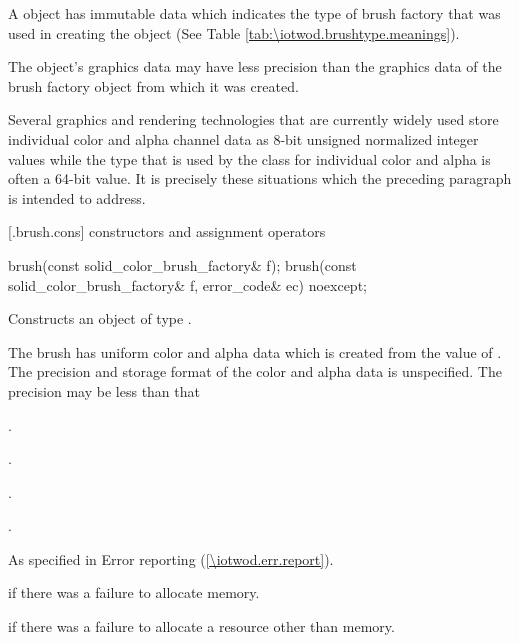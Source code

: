 \pnum
A  object has immutable  data which indicates the type of brush factory that was used in creating the  object (See Table \ref{tab:\iotwod.brushtype.meanings}).

\pnum
The  object's graphics data may have less precision than the graphics data of the brush factory object from which it was created.

\pnum
\enterexample
Several graphics and rendering technologies that are currently widely used store individual color and alpha channel data as 8-bit unsigned normalized integer values while the  type that is used by the  class for individual color and alpha is often a 64-bit value. It is precisely these situations which the preceding paragraph is intended to address.
\exitexample

 [\iotwod.brush.cons] { constructors and assignment operators}

\begin{itemdecl}
    brush(const solid_color_brush_factory& f);
    brush(const solid_color_brush_factory& f, error_code& ec) noexcept;
\end{itemdecl}
\begin{itemdescr}
	\pnum
	\effects
	Constructs an object of type .
	
	\pnum
	The brush has uniform color and alpha data which is created from the value of . The precision and storage format of the color and alpha data is unspecified. The precision may be less than that  
	
	\pnum
	\postconditions
	.
	
	.
	
	.
	
	.

	\pnum
	\throws
	As specified in Error reporting (\ref{\iotwod.err.report}).
	
	\pnum
	\errors
	 if there was a failure to allocate memory.
	
	 if there was a failure to allocate a resource other than memory.
	
\end{itemdescr}

